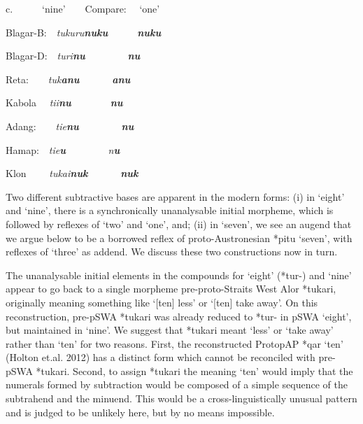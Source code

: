 c.\ \ \ \ \ \ {\textquoteleft}nine{\textquoteright}\ \ \ \ Compare: \ \ {\textquoteleft}one{\textquoteright}

Blagar-B:\ \ \textit{tukuru}\textbf{\textit{nuku}}\ \ \ \ \ \ \textbf{\textit{nuku}} 

Blagar-D:\ \ \textit{turi}\textbf{\textit{nu}} \ \ \ \ \ \ \ \ \textbf{\textit{nu}} 

Reta:\ \ \ \ \textit{tuk}\textbf{\textit{anu}} \ \ \ \ \ \ \textbf{\textit{anu}}

Kabola \ \ \textit{ti}\textit{{\textglotstop}i}\textbf{\textit{nu}}\ \ \ \ \ \ \ \ \textbf{\textit{nu}}\textbf{ }

Adang:\ \ \ \ \textit{ti}\textit{{\textglotstop}e}\textbf{\textit{nu}} \ \ \ \ \ \ \ \ \textbf{\textit{nu}}\textbf{ }

Hamap:\ \ \textit{tie}\textbf{\textit{u}} \ \ \ \ \ \ \ \ \textit{n}\textbf{\textit{u}}\textbf{ }

Klon \ \ \ \ \textit{tukai}\textbf{\textit{nuk}} \ \ \ \ \ \ \textbf{\textit{nuk}}

Two different subtractive bases are apparent in the modern forms: (i) in {\textquoteleft}eight{\textquoteright} and {\textquoteleft}nine{\textquoteright}, there is a synchronically unanalysable initial morpheme, which is followed by reflexes of {\textquoteleft}two{\textquoteright} and {\textquoteleft}one{\textquoteright}, and; (ii) in {\textquoteleft}seven{\textquoteright}, we see an augend that we argue below to be a borrowed reflex of proto-Austronesian *pitu {\textquoteleft}seven{\textquoteright}, with reflexes of {\textquoteleft}three{\textquoteright} as addend. We discuss these two constructions now in turn.

The unanalysable initial elements in the compounds for {\textquoteleft}eight{\textquoteright} (*tur-) and {\textquoteleft}nine{\textquoteright} appear to go back to a single morpheme pre-proto-Straits West Alor *tukari, originally meaning something like {\textquoteleft}[ten] less{\textquoteright} or {\textquoteleft}[ten] take away{\textquoteright}. On this reconstruction, pre-pSWA *tukari was already reduced to *tur- in pSWA {\textquoteleft}eight{\textquoteright}, but maintained in {\textquoteleft}nine{\textquoteright}. We suggest that *tukari meant {\textquoteleft}less{\textquoteright} or {\textquoteleft}take away{\textquoteright} rather than {\textquoteleft}ten{\textquoteright} for two reasons. First, the reconstructed ProtopAP *qar {\textquoteleft}ten{\textquoteright} (Holton et.al. 2012) has a distinct form which cannot be reconciled with pre-pSWA *tukari. Second, to assign *tukari the meaning {\textquoteleft}ten{\textquoteright} would imply that the numerals formed by subtraction would be composed of a 
simple sequence of the subtrahend and the minuend. This would be a cross-linguistically unusual pattern and is judged to be unlikely here, but by no means impossible. 

